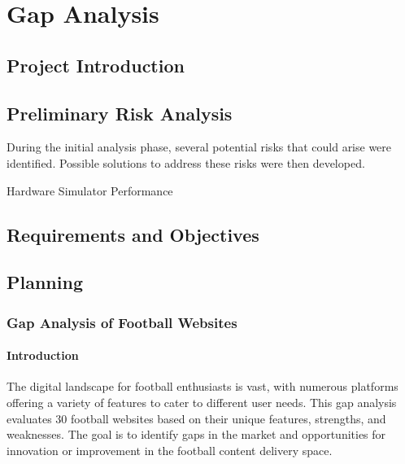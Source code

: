 \chapter{Gap Analysis}
\label{chap:gap-analysis}


\section{Project Introduction}

\section{Preliminary Risk Analysis}

During the initial analysis phase, several potential risks that could arise were identified.  
Possible solutions to address these risks were then developed.

\begin{risk}{Hardware Simulator Performance}
    \label{risk:hardware-simulator} 
\end{risk}

\section{Requirements and Objectives}

\section{Planning}

\subsection{Gap Analysis of Football Websites}

\subsubsection{Introduction}
The digital landscape for football enthusiasts is vast, with numerous platforms offering a variety of features to cater to different user needs. This gap analysis evaluates 30 football websites based on their unique features, strengths, and weaknesses. The goal is to identify gaps in the market and opportunities for innovation or improvement in the football content delivery space.

